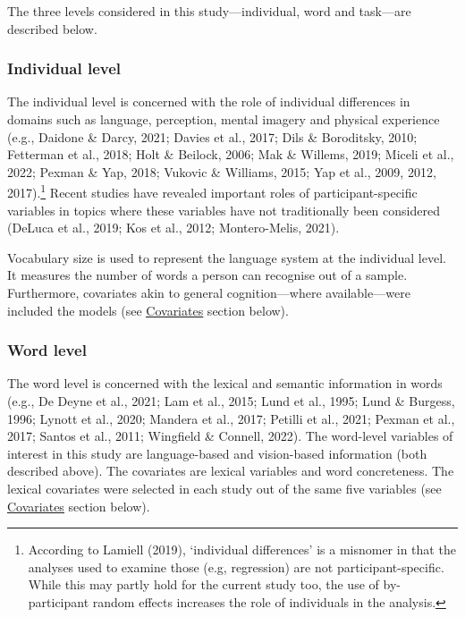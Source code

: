 \documentclass[
  12pt,
  man,floatsintext]{apa7}
\begin{document}
The three levels considered in this study---individual, word and task---are described below.

\hypertarget{individual-level}{%
\subsubsection{Individual level}\label{individual-level}}

The individual level is concerned with the role of individual differences in domains such as language, perception, mental imagery and physical experience (e.g., Daidone \& Darcy, 2021; Davies et al., 2017; Dils \& Boroditsky, 2010; Fetterman et al., 2018; Holt \& Beilock, 2006; Mak \& Willems, 2019; Miceli et al., 2022; Pexman \& Yap, 2018; Vukovic \& Williams, 2015; Yap et al., 2009, 2012, 2017).\footnote{According to Lamiell (2019), `individual differences' is a misnomer in that the analyses used to examine those (e.g, regression) are not participant-specific. While this may partly hold for the current study too, the use of by-participant random effects increases the role of individuals in the analysis.} Recent studies have revealed important roles of participant-specific variables in topics where these variables have not traditionally been considered (DeLuca et al., 2019; Kos et al., 2012; Montero-Melis, 2021).

Vocabulary size is used to represent the language system at the individual level. It measures the number of words a person can recognise out of a sample. Furthermore, covariates akin to general cognition---where available---were included the models (see \protect\hyperlink{covariates}{\underline{Covariates}} section below).

\hypertarget{word-level}{%
\subsubsection{Word level}\label{word-level}}

The word level is concerned with the lexical and semantic information in words (e.g., De Deyne et al., 2021; Lam et al., 2015; Lund et al., 1995; Lund \& Burgess, 1996; Lynott et al., 2020; Mandera et al., 2017; Petilli et al., 2021; Pexman et al., 2017; Santos et al., 2011; Wingfield \& Connell, 2022). The word-level variables of interest in this study are language-based and vision-based information (both described above). The covariates are lexical variables and word concreteness. The lexical covariates were selected in each study out of the same five variables (see \protect\hyperlink{covariates}{\underline{Covariates}} section below).
\end{document}
